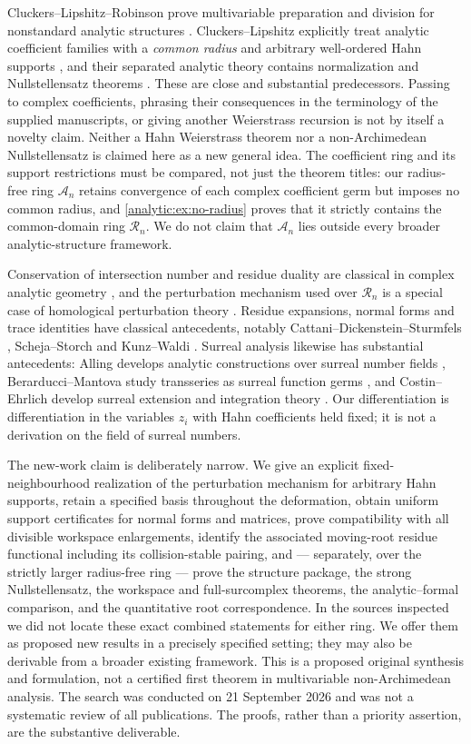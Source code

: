 \documentclass[11pt,letterpaper]{article}
\theoremstyle{definition}
\theoremstyle{remark}
\newcommand{\A}{\mathscr A}
\newcommand{\RR}{\mathscr R}
\numberwithin{equation}{section}
\begin{document}
Cluckers--Lipshitz--Robinson prove multivariable preparation and division
for nonstandard analytic structures \cite[Theorem 2.5 and Remark
2.6]{CLR}. Cluckers--Lipshitz explicitly treat analytic coefficient
families with a \emph{common radius} and arbitrary well-ordered Hahn
supports \cite[\S3.1, Remark 3.1.4, Example 3.3(6)]{CL}, and their
separated analytic theory contains normalization and Nullstellensatz
theorems \cite[\S5.2]{CL}. These are close and substantial predecessors.
Passing to complex coefficients, phrasing their consequences in the
terminology of the supplied manuscripts, or giving another Weierstrass
recursion is not by itself a novelty claim. Neither a Hahn Weierstrass
theorem nor a non-Archimedean Nullstellensatz is claimed here as a new
general idea. The coefficient ring and its support restrictions must be
compared, not just the theorem titles: our radius-free ring $\A_n$ retains
convergence of each complex coefficient germ but imposes no common radius,
and \cref{analytic:ex:no-radius} proves that it strictly contains the
common-domain ring $\RR_n$. We do not claim that $\A_n$ lies outside every
broader analytic-structure framework.

Conservation of intersection number and residue duality are classical in
complex analytic geometry \cite{GunningRossi,GH,SS,GrauertRemmert}, and the
perturbation mechanism used over $\RR_n$ is a special case of homological
perturbation theory \cite{Crainic}. Residue expansions, normal forms and
trace identities have classical antecedents, notably
Cattani--Dickenstein--Sturmfels \cite{CDS}, Scheja--Storch \cite{SS} and
Kunz--Waldi \cite{KW}. Surreal analysis likewise has substantial
antecedents: Alling develops analytic constructions over surreal number
fields \cite{Alling}, Berarducci--Mantova study transseries as surreal
function germs \cite{BM}, and Costin--Ehrlich develop surreal extension and
integration theory \cite{CE}. Our differentiation is differentiation in the
variables $z_i$ with Hahn coefficients held fixed; it is not a derivation on
the field of surreal numbers.

The new-work claim is deliberately narrow. We give an explicit
fixed-neighbourhood realization of the perturbation mechanism for arbitrary
Hahn supports, retain a specified basis throughout the deformation, obtain
uniform support certificates for normal forms and matrices, prove
compatibility with all divisible workspace enlargements, identify the
associated moving-root residue functional including its collision-stable
pairing, and --- separately, over the strictly larger radius-free ring ---
prove the structure package, the strong Nullstellensatz, the workspace and
full-surcomplex theorems, the analytic--formal comparison, and the
quantitative root correspondence. In the sources inspected we did not
locate these exact combined statements for either ring. We offer them as
proposed new results in a precisely specified setting; they may also be
derivable from a broader existing framework. This is a proposed original
synthesis and formulation, not a certified first theorem in multivariable
non-Archimedean analysis. The search was conducted on 21 September 2026 and
was not a systematic review of all publications. The proofs, rather than a
priority assertion, are the substantive deliverable.
\end{document}
